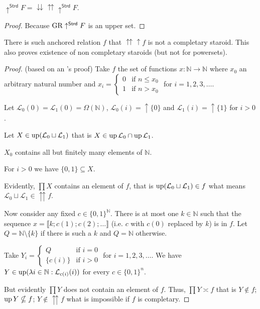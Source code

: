 \begin{prop}
$\uparrow^{\mathsf{Strd}}F=\downdownarrows\upuparrows\uparrow^{\mathsf{Strd}}F$.\end{prop}
\begin{proof}
Because $\operatorname{GR}\uparrow^{\mathsf{Strd}}F$ is an upper set.\end{proof}
\begin{example}
\label{non-completary}There is such anchored relation $f$ that $\upuparrows\uparrow f$
is not a completary staroid. This also proves existence of non completary
staroids (but not for powersets).\end{example}
\begin{proof}
(based on an 's proof) Take $f$ the set of functions
$x:\mathbb{N}\rightarrow\mathbb{N}$ where $x_{0}$ an arbitrary natural
number and $x_{i}=\left\{ \begin{array}{ll}
0 & \text{if }n\leqslant x_{0}\\
1 & \text{if }n>x_{0}
\end{array}\right.$ for $i=1,2,3,\ldots$.

Let $\mathcal{L}_{0}(0)=\mathcal{L}_{1}(0)=\Omega(\mathbb{N})$, $\mathcal{L}_{0}(i)=\uparrow\{0\}$
and $\mathcal{L}_{1}(i)=\uparrow\{1\}$ for $i>0$.

Let $X\in\operatorname{up}(\mathcal{L}_{0}\sqcup\mathcal{L}_{1})$ that is $X\in\operatorname{up}\mathcal{L}_{0}\cap\operatorname{up}\mathcal{L}_{1}$.

$X_{0}$ contains all but finitely many elements of $\mathbb{N}$.

For $i>0$ we have $\{0,1\}\subseteq X$.

Evidently, $\prod X$ contains an element of $f$,
that is $\operatorname{up}(\mathcal{L}_0\sqcup\mathcal{L}_1)\in f$ what means
$\mathcal{L}_0\sqcup\mathcal{L}_1\in\upuparrows f$.

Now consider any fixed $c\in\{0,1\}^{\mathbb{N}}$. There is at most
one $k\in\mathbb{N}$ such that the sequence $x=\llbracket k;c(1);c(2);\ldots\rrbracket$
(i.e. $c$ with $c(0)$ replaced by $k$) is in $f$. Let $Q=\mathbb{N}\setminus\{k\}$
if there is such a $k$ and $Q=\mathbb{N}$ otherwise.

Take $Y_{i}=\left\{ \begin{array}{ll}
Q & \text{if }i=0\\
\{c(i)\} & \text{if }i>0
\end{array}\right.$ for $i=1,2,3,\ldots$. We have $Y\in\operatorname{up}(\lambda i\in\mathbb{N}:\mathcal{L}_{c(i)}(i))$ for every $c\in\{0,1\}^n$.

But evidently $\prod Y$ does not contain an element of $f$.
Thus, $\prod Y\asymp f$ that is
$Y\notin f$; $\operatorname{up} Y\nsubseteq f$; $Y\notin\upuparrows f$ what is impossible if $f$ is completary.
\end{proof}
